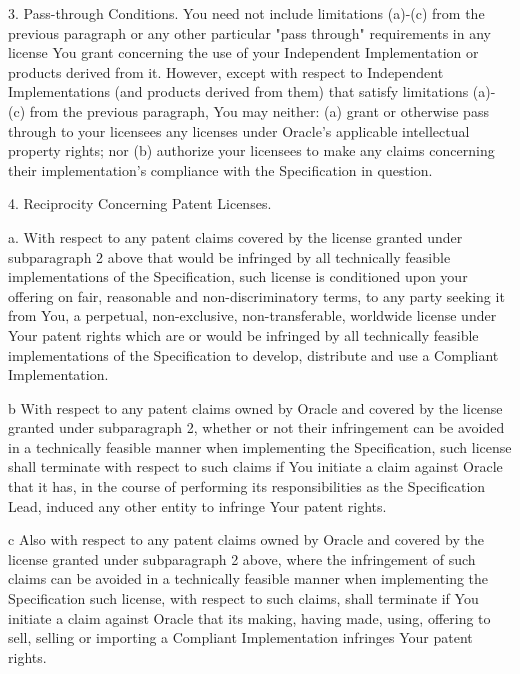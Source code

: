\begin{flushleft}
3. Pass-through Conditions. You need not include limitations (a)-(c) from the previous paragraph or any other particular "pass through" requirements in any license You grant concerning the use of your Independent Implementation or products derived from it.  However, except with respect to Independent Implementations (and products derived from them) that satisfy limitations (a)-(c) from the previous paragraph, You may neither:  (a) grant or otherwise pass through to your licensees any licenses under Oracle’s applicable intellectual property rights; nor (b) authorize your licensees to make any claims concerning their implementation's compliance with the Specification in question.

4. Reciprocity Concerning Patent Licenses.  

	a.  With respect to any patent claims covered by the license granted under subparagraph 2 above that would be infringed by all technically feasible implementations of the Specification, such license is conditioned upon your offering on fair, reasonable and non-discriminatory terms, to any party seeking it from You, a perpetual, non-exclusive, non-transferable, worldwide license under Your patent rights which are or would be infringed by all technically feasible implementations of the Specification to develop, distribute and use a Compliant Implementation.

	b  With respect to any patent claims owned by Oracle and covered by the license granted under subparagraph 2, whether or not their infringement can be avoided in a technically feasible manner when implementing the Specification, such license shall terminate with respect to such claims if You initiate a claim against Oracle that it has, in the course of performing its responsibilities as the Specification Lead, induced any other entity to infringe Your patent rights.

	c  Also with respect to any patent claims owned by Oracle and covered by the license granted under subparagraph 2 above, where the infringement of such claims can be avoided in a technically feasible manner when implementing the Specification such license, with respect to such claims, shall terminate if You initiate a claim against Oracle  that its making, having made, using, offering to sell, selling or importing a Compliant Implementation infringes Your patent rights.


\end{flushleft}
